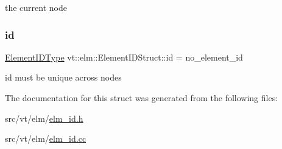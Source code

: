 the current node \mbox{\label{structvt_1_1elm_1_1_element_i_d_struct_aa4dc0aed0581098508f2d2b3f8475d10}} 
\subsubsection{\texorpdfstring{id}{id}}
{\footnotesize\ttfamily \hyperlink{namespacevt_1_1elm_a63afb64985b41b7b6dcf2f01336391f8}{Element\+I\+D\+Type} vt\+::elm\+::\+Element\+I\+D\+Struct\+::id = no\+\_\+element\+\_\+id}

id must be unique across nodes 

The documentation for this struct was generated from the following files\+:\begin{DoxyCompactItemize}
\item 
src/vt/elm/\hyperlink{elm__id_8h}{elm\+\_\+id.\+h}\item 
src/vt/elm/\hyperlink{elm__id_8cc}{elm\+\_\+id.\+cc}\end{DoxyCompactItemize}
